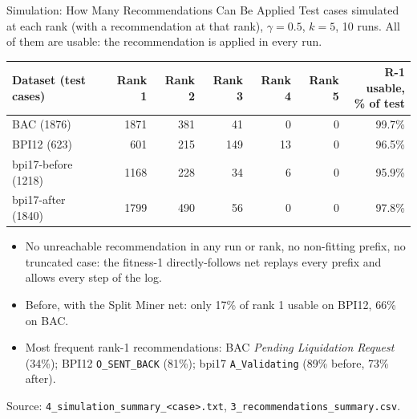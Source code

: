 \documentclass[aspectratio=169]{beamer} %
\begin{document}
\begin{frame}{Simulation: How Many Recommendations Can Be Applied}
  \footnotesize
  Test cases \alert{simulated} at each rank (with a recommendation at that rank), $\gamma = 0.5$, $k = 5$,
  10 runs. All of them are \alert{usable}: the recommendation is applied in every run.
  \begin{center}\setlength{\tabcolsep}{5pt}
  \begin{tabular}{lrrrrrr}
    \toprule
    Dataset (test cases) & Rank 1 & Rank 2 & Rank 3 & Rank 4 & Rank 5 & \shortstack{R-1 usable,\\ \% of test} \\
    \midrule
    BAC (1876)          & 1871 &  381 &   41 &    0 &   0 &  99.7\% \\
    BPI12 (623)         &  601 &  215 &  149 &   13 &   0 &  96.5\% \\
    bpi17-before (1218) & 1168 &  228 &   34 &    6 &   0 &  95.9\% \\
    bpi17-after (1840)  & 1799 &  490 &   56 &    0 &   0 &  97.8\% \\
    \bottomrule
  \end{tabular}
  \end{center}
  \begin{itemize}
    \item \alert{No unreachable recommendation} in any run or rank, no non-fitting prefix, no truncated case:
      the fitness-1 directly-follows net replays every prefix and allows every step of the log.
    \item Before, with the Split Miner net: only 17\% of rank 1 usable on BPI12, 66\% on BAC.
    \item Most frequent rank-1 recommendations: BAC \emph{Pending Liquidation Request} (34\%); BPI12
      \texttt{O\_SENT\_BACK} (81\%); bpi17 \texttt{A\_Validating} (89\% before, 73\% after).
  \end{itemize}
  {\scriptsize Source: \texttt{4\_simulation\_summary\_<case>.txt}, \texttt{3\_recommendations\_summary.csv}.}
\end{frame}
\end{document}

